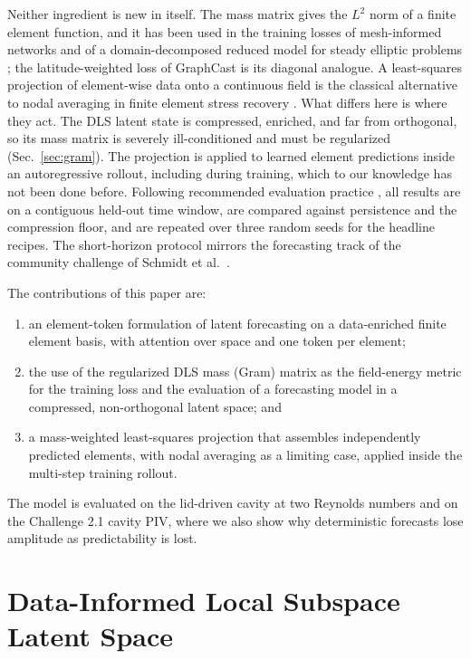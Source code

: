 \documentclass[conf]{new-aiaa}
\begin{document}
Neither ingredient is new in itself. The mass matrix gives the $L^2$ norm of a finite element function, and it has been used in the training losses of mesh-informed networks \cite{franco2023minn} and of a domain-decomposed reduced model for steady elliptic problems \cite{dimola2026ddrom}; the latitude-weighted loss of GraphCast \cite{lam2023graphcast} is its diagonal analogue. A least-squares projection of element-wise data onto a continuous field is the classical alternative to nodal averaging in finite element stress recovery \cite{hinton1974smoothing}. What differs here is where they act. The DLS latent state is compressed, enriched, and far from orthogonal, so its mass matrix is severely ill-conditioned and must be regularized (Sec.~\ref{sec:gram}). The projection is applied to learned element predictions inside an autoregressive rollout, including during training, which to our knowledge has not been done before. Following recommended evaluation practice \cite{mcgreivy2024weak}, all results are on a contiguous held-out time window, are compared against persistence and the compression floor, and are repeated over three random seeds for the headline recipes. The short-horizon protocol mirrors the forecasting track of the community challenge of Schmidt et al.~\cite{schmidt2026challenge}.

The contributions of this paper are:
\begin{enumerate}
  \item an element-token formulation of latent forecasting on a data-enriched finite element basis, with attention over space and one token per element;
  \item the use of the regularized DLS mass (Gram) matrix as the field-energy metric for the training loss and the evaluation of a forecasting model in a compressed, non-orthogonal latent space; and
  \item a mass-weighted least-squares projection that assembles independently predicted elements, with nodal averaging as a limiting case, applied inside the multi-step training rollout.
\end{enumerate}
The model is evaluated on the lid-driven cavity at two Reynolds numbers and on the Challenge 2.1 cavity PIV, where we also show why deterministic forecasts lose amplitude as predictability is lost.

\section{Data-Informed Local Subspace Latent Space}
\label{sec:dls}
\end{document}

